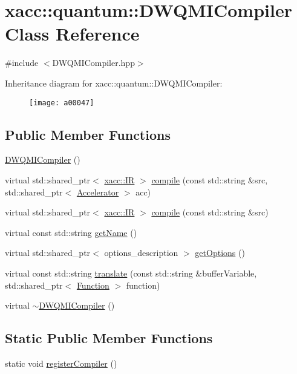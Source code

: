 \hypertarget{a00047}{}\section{xacc\+:\+:quantum\+:\+:D\+W\+Q\+M\+I\+Compiler Class Reference}
\label{a00047}


{\ttfamily \#include $<$D\+W\+Q\+M\+I\+Compiler.\+hpp$>$}

Inheritance diagram for xacc\+:\+:quantum\+:\+:D\+W\+Q\+M\+I\+Compiler\+:\begin{figure}[H]
\begin{center}
\leavevmode
\texttt{[image: a00047]}
\end{center}
\end{figure}
\subsection*{Public Member Functions}
\begin{DoxyCompactItemize}
\item 
\hyperlink{a00047_a1f285f3eaec09363d9439676dbdfbd6a}{D\+W\+Q\+M\+I\+Compiler} ()
\item 
virtual std\+::shared\+\_\+ptr$<$ \hyperlink{a00077}{xacc\+::\+IR} $>$ \hyperlink{a00047_a0df05642f1a6fd44ce7f1c0396d50c9c}{compile} (const std\+::string \&src, std\+::shared\+\_\+ptr$<$ \hyperlink{a00017}{Accelerator} $>$ acc)
\item 
virtual std\+::shared\+\_\+ptr$<$ \hyperlink{a00077}{xacc\+::\+IR} $>$ \hyperlink{a00047_aa22591343b5509bf2c3a5820130ba906}{compile} (const std\+::string \&src)
\item 
virtual const std\+::string \hyperlink{a00047_aed42de96f8e0dd94b6de183f28aee419}{get\+Name} ()
\item 
virtual std\+::shared\+\_\+ptr$<$ options\+\_\+description $>$ \hyperlink{a00047_a0851334cc33b5b1da2694150a0a1a43c}{get\+Options} ()
\item 
virtual const std\+::string \hyperlink{a00047_a56a345539665099329209b3b5f6810c9}{translate} (const std\+::string \&buffer\+Variable, std\+::shared\+\_\+ptr$<$ \hyperlink{a00059}{Function} $>$ function)
\item 
virtual \hyperlink{a00047_a86f9135f7dc1c3246970e2a7f6540b5c}{$\sim$\+D\+W\+Q\+M\+I\+Compiler} ()
\end{DoxyCompactItemize}
\subsection*{Static Public Member Functions}
\begin{DoxyCompactItemize}
\item 
static void \hyperlink{a00047_a421daa5286f31e2b5ab4c141a34c94cd}{register\+Compiler} ()
\end{DoxyCompactItemize}
